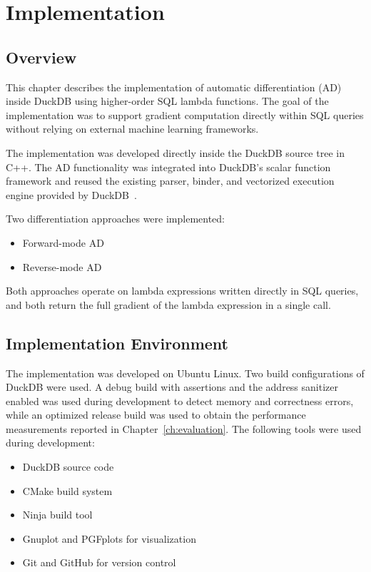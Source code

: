 \documentclass[12pt]{report}
\begin{document}

\chapter{Implementation}
\label{ch:implementation}

\section{Overview}

This chapter describes the implementation of automatic differentiation (AD) inside DuckDB using higher-order SQL lambda functions. The goal of the implementation was to support gradient computation directly within SQL queries without relying on external machine learning frameworks.

The implementation was developed directly inside the DuckDB source tree in C++. The AD functionality was integrated into DuckDB's scalar function framework and reused the existing parser, binder, and vectorized execution engine provided by DuckDB~\cite{duckdb2019}.

Two differentiation approaches were implemented:

\begin{itemize}
     \item Forward-mode AD
     \item Reverse-mode AD
\end{itemize}

Both approaches operate on lambda expressions written directly in SQL queries, and both return the full gradient of the lambda expression in a single call.

\section{Implementation Environment}

The implementation was developed on Ubuntu Linux. Two build configurations of DuckDB were used. A debug build with assertions and the address sanitizer enabled was used during development to detect memory and correctness errors, while an optimized release build was used to obtain the performance measurements reported in Chapter~\ref{ch:evaluation}. The following tools were used during development:

\begin{itemize}
    \item DuckDB source code
    \item CMake build system
    \item Ninja build tool
    \item Gnuplot and PGFplots for visualization
    \item Git and GitHub for version control
\end{itemize}
\end{document}
